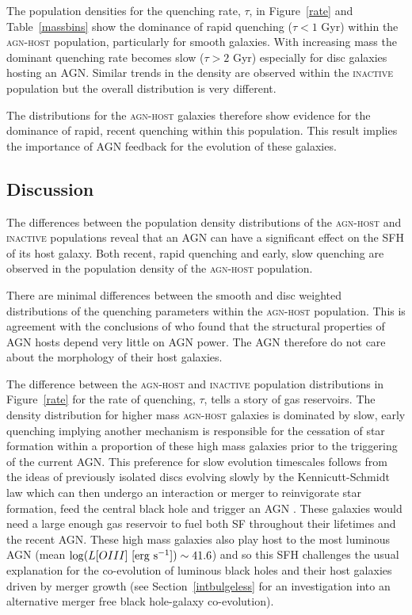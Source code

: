 The population densities for the quenching rate, $\tau$, in Figure~\ref{rate} and Table~\ref{massbins} show the dominance of rapid quenching ($\tau < 1$ Gyr) within the \textsc{agn-host} population, particularly for smooth galaxies. With increasing mass the dominant quenching rate becomes slow ($\tau > 2$ Gyr) especially for disc galaxies hosting an AGN. Similar trends in the density are observed within the \textsc{inactive} population but the overall distribution is very different. 


The distributions for the \textsc{agn-host} galaxies therefore show evidence for the dominance of rapid, recent quenching within this population. This result implies the importance of AGN feedback for the evolution of these galaxies.

\subsection{Discussion}\label{dis}

The differences between the population density distributions of the \textsc{agn-host} and \textsc{inactive} populations reveal that an AGN can have a significant effect on the SFH of its host galaxy. Both recent, rapid quenching and early, slow quenching are observed in the population density of the \textsc{agn-host} population. 


There are minimal differences between the smooth and disc weighted distributions of the quenching parameters within the \textsc{agn-host} population. This is agreement with the conclusions of \citet{kauffmann03b} who found that the structural properties of AGN hosts depend very little on AGN power. The AGN therefore do not care about the morphology of their host galaxies. 


The difference between the \textsc{agn-host} and \textsc{inactive} population distributions in Figure~\ref{rate} for the rate of quenching, $\tau$, tells a story of gas reservoirs. The density distribution for higher mass \textsc{agn-host} galaxies is dominated by slow, early quenching implying another mechanism is responsible for the cessation of star formation within a proportion of these high mass galaxies prior to the triggering of the current AGN.  This preference for slow evolution timescales follows from the ideas of previously isolated discs evolving slowly by the Kennicutt-Schmidt \citep{Schmidt59, Kennicutt97} law which can then undergo an interaction or merger to reinvigorate star formation, feed the central black hole and trigger an AGN \citep{Varela04, emsellem15}. These galaxies would need a large enough gas reservoir to fuel both SF throughout their lifetimes and the recent AGN. These high mass galaxies also play host to the most luminous AGN (mean $\log (L[OIII] ~[\rm{erg}~s^{-1}]) \sim 41.6$) and so this SFH challenges the usual explanation for the co-evolution of luminous black holes and their host galaxies driven by merger growth (see Section~\ref{intbulgeless} for an investigation into an alternative merger free black hole-galaxy co-evolution). 


